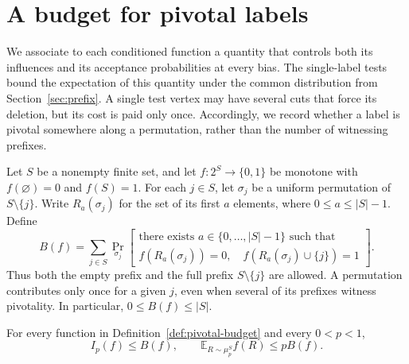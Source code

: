 \section{A budget for pivotal labels}
\label{sec:pivotality}

We associate to each conditioned function a quantity that controls both its
influences and its acceptance probabilities at every bias.  The single-label
tests bound the expectation of this quantity under the common distribution
from Section~\ref{sec:prefix}.
A single test vertex may have several cuts that force its deletion, but its
cost is paid only once.  Accordingly, we record whether a label is pivotal
somewhere along a permutation, rather than the number of witnessing prefixes.

\begin{definition}
\label{def:pivotal-budget}
Let $S$ be a nonempty finite set, and let
$f:2^S\to\{0,1\}$ be monotone with $f(\varnothing)=0$ and $f(S)=1$.
For each $j\in S$, let $\sigma_j$ be a uniform permutation of
$S\setminus\{j\}$.  Write $R_a(\sigma_j)$ for the set of its first $a$
elements, where $0\le a\le |S|-1$.  Define
\[
 B(f)=\sum_{j\in S}
 \Pr_{\sigma_j}\!\left[
 \begin{gathered}
   \text{there exists }a\in\{0,\ldots,|S|-1\}\text{ such that}\\
   f(R_a(\sigma_j))=0,\quad
   f(R_a(\sigma_j)\cup\{j\})=1
 \end{gathered}
 \right].
\]
Thus both the empty prefix and the full prefix $S\setminus\{j\}$ are
allowed.  A permutation contributes only once for a given $j$, even when
several of its prefixes witness pivotality.  In particular,
$0\le B(f)\le |S|$.
\end{definition}

\begin{lemma}
\label{lem:pivotal-inequalities}
For every function in Definition~\ref{def:pivotal-budget} and every
$0<p<1$,
\[
 I_p(f)\le B(f),
 \qquad
 \mathbb E_{R\sim\mu_p^S} f(R)\le pB(f).
\]
\end{lemma}

